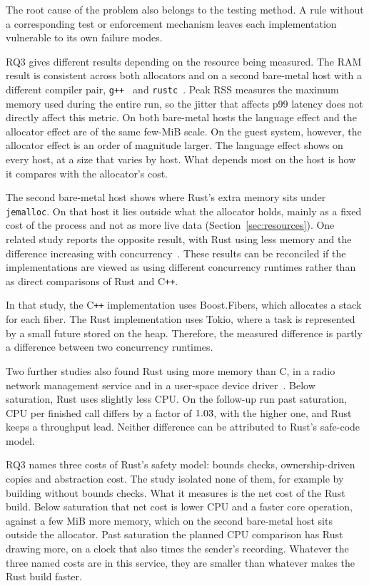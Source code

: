 \documentclass[english,oneside,a4paper,censored,csm,software-track-2020]{HYthesisML}
\begin{document}
The root cause of the problem also belongs to the testing method. A rule without
a corresponding test or enforcement mechanism leaves each implementation
vulnerable to its own failure modes.

RQ3 gives different results depending on the resource being measured. The RAM
result is consistent across both allocators and on a second bare-metal host with
a different compiler pair, \texttt{g++~\BmGpp} and \texttt{rustc~\BmRustc}. Peak RSS measures the maximum memory used during the entire run, so
the jitter that affects p99 latency does not directly affect this metric. On
both bare-metal hosts the language effect and the allocator effect are of the
same few-MiB scale. On the guest system, however, the allocator effect is an
order of magnitude larger. The language effect shows on every host, at a size
that varies by host. What depends most on the host is how it compares with the
allocator's cost.

The second bare-metal host shows where Rust's extra memory sits under
\texttt{jemalloc}. On that host it lies outside what the allocator holds, mainly as a fixed
cost of the process and not as more live data (Section~\ref{sec:resources}). One related study reports the opposite
result, with Rust using less memory and the difference increasing with
concurrency~\cite{karlback2021ran}. These results can be reconciled if the
implementations are viewed as using different concurrency runtimes rather than
as direct comparisons of Rust and C\texttt{++}.

In that study, the C\texttt{++} implementation uses Boost.Fibers, which
allocates a stack for each fiber. The Rust implementation uses Tokio, where a
task is represented by a small future stored on the heap. Therefore, the
measured difference is partly a difference between two concurrency runtimes.

Two further studies also found Rust using more memory than C, in a radio
network management service and in a user-space device
driver~\cite{olsson2023ranmgmt,sundvisson2026drivers}. Below saturation, Rust
uses slightly less CPU. On the follow-up run past saturation, CPU per finished
call differs by a factor of $1.03$, with
\ProbeAfterCpuPerOpHigher{} the higher one, and Rust keeps a throughput lead.
Neither difference can be attributed to Rust's safe-code model.

RQ3 names three costs of Rust's safety model: bounds checks, ownership-driven
copies and abstraction cost. The study isolated none of them, for example by
building without bounds checks. What it measures is the net cost of the Rust
build. Below saturation that net cost is lower CPU and a faster core operation, against a few
MiB more memory, which on the second bare-metal host sits outside the allocator. Past
saturation the planned CPU comparison has Rust drawing more, on a clock that also times the
sender's recording. Whatever the
three named costs are in this service, they are smaller than whatever makes the
Rust build faster.
\end{document}
